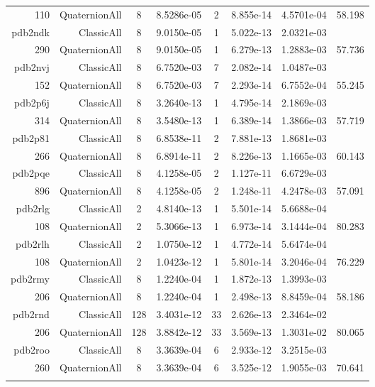 \begin{xltabular}{\textwidth}{r|rcS[table-format=1.4e+2]cS[table-format=1.3e+2]S[table-format=1.4e+2]S[table-format=-1.3]}
110 & QuaternionAll & 8 & 8.5286e-05 & 2 & 8.855e-14 & 4.5701e-04 & 58.198\\  \addlinespace
pdb2ndk & ClassicAll & 8 & 9.0150e-05 & 1 & 5.022e-13 & 2.0321e-03 & \\
290 & QuaternionAll & 8 & 9.0150e-05 & 1 & 6.279e-13 & 1.2883e-03 & 57.736\\  \addlinespace
pdb2nvj & ClassicAll & 8 & 6.7520e-03 & 7 & 2.082e-14 & 1.0487e-03 & \\
152 & QuaternionAll & 8 & 6.7520e-03 & 7 & 2.293e-14 & 6.7552e-04 & 55.245\\  \addlinespace
pdb2p6j & ClassicAll & 8 & 3.2640e-13 & 1 & 4.795e-14 & 2.1869e-03 & \\
314 & QuaternionAll & 8 & 3.5480e-13 & 1 & 6.389e-14 & 1.3866e-03 & 57.719\\  \addlinespace
pdb2p81 & ClassicAll & 8 & 6.8538e-11 & 2 & 7.881e-13 & 1.8681e-03 & \\
266 & QuaternionAll & 8 & 6.8914e-11 & 2 & 8.226e-13 & 1.1665e-03 & 60.143\\  \addlinespace
pdb2pqe & ClassicAll & 8 & 4.1258e-05 & 2 & 1.127e-11 & 6.6729e-03 & \\
896 & QuaternionAll & 8 & 4.1258e-05 & 2 & 1.248e-11 & 4.2478e-03 & 57.091\\  \addlinespace
pdb2rlg & ClassicAll & 2 & 4.8140e-13 & 1 & 5.501e-14 & 5.6688e-04 & \\
108 & QuaternionAll & 2 & 5.3066e-13 & 1 & 6.973e-14 & 3.1444e-04 & 80.283\\  \addlinespace
pdb2rlh & ClassicAll & 2 & 1.0750e-12 & 1 & 4.772e-14 & 5.6474e-04 & \\
108 & QuaternionAll & 2 & 1.0423e-12 & 1 & 5.801e-14 & 3.2046e-04 & 76.229\\  \addlinespace
pdb2rmy & ClassicAll & 8 & 1.2240e-04 & 1 & 1.872e-13 & 1.3993e-03 & \\
206 & QuaternionAll & 8 & 1.2240e-04 & 1 & 2.498e-13 & 8.8459e-04 & 58.186\\  \addlinespace
pdb2rnd & ClassicAll & 128 & 3.4031e-12 & 33 & 2.626e-13 & 2.3464e-02 & \\
206 & QuaternionAll & 128 & 3.8842e-12 & 33 & 3.569e-13 & 1.3031e-02 & 80.065\\  \addlinespace
pdb2roo & ClassicAll & 8 & 3.3639e-04 & 6 & 2.933e-12 & 3.2515e-03 & \\
260 & QuaternionAll & 8 & 3.3639e-04 & 6 & 3.525e-12 & 1.9055e-03 & 70.641\\  \addlinespace

\end{xltabular}
